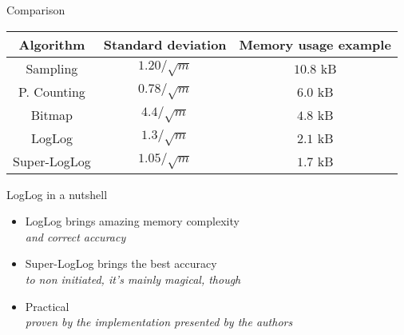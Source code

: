 \documentclass[aspectratio=169]{beamer}
\begin{document}
  \begin{frame}{Comparison}
    \only<+->{\vspace*{.4cm}}

    \begin{center}
      \begin{tabular}{c|cc}
        Algorithm & Standard deviation & Memory usage example\\\hline
        Sampling & $1.20/\sqrt{m}$ & $10.8$ kB\\\hline
        P. Counting & $0.78/\sqrt{m}$ & $6.0$ kB\\\hline
        Bitmap & $4.4/\sqrt{m}$ & $4.8$ kB\\\hline
        LogLog & $1.3/\sqrt{m}$ & $2.1$ kB\\\hline
        Super-LogLog & $1.05/\sqrt{m}$ & $1.7$ kB
      \end{tabular}
    \end{center}
  \end{frame}


  \begin{frame}{LogLog in a nutshell}
    \only<+->{\vspace*{.4cm}}

    \begin{itemize}[<+-|alert@+>]
      \item LogLog brings amazing memory complexity\\
        {\footnotesize\itshape%
        and correct accuracy}
      \item Super-LogLog brings the best accuracy\\
        {\footnotesize\itshape%
        to non initiated, it's mainly magical, though}
      \item Practical\\
        {\footnotesize\itshape%
        proven by the implementation presented by the authors}
    \end{itemize}\bigskip

  \end{frame}
\end{document}
